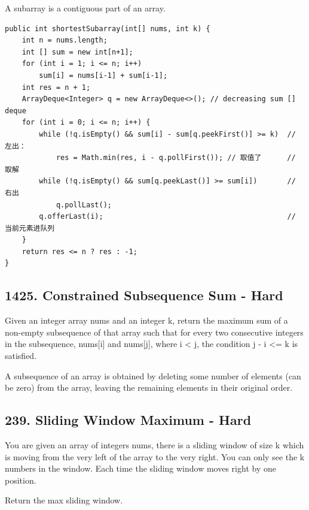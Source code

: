 \documentclass[9pt, b5paper]{article}
\begin{document}
A subarray is a contiguous part of an array.
\begin{verbatim}
public int shortestSubarray(int[] nums, int k) { 
    int n = nums.length;
    int [] sum = new int[n+1];  
    for (int i = 1; i <= n; i++)  
        sum[i] = nums[i-1] + sum[i-1];
    int res = n + 1;
    ArrayDeque<Integer> q = new ArrayDeque<>(); // decreasing sum [] deque
    for (int i = 0; i <= n; i++) {
        while (!q.isEmpty() && sum[i] - sum[q.peekFirst()] >= k)  // 左出：
            res = Math.min(res, i - q.pollFirst()); // 取值了      // 取解
        while (!q.isEmpty() && sum[q.peekLast()] >= sum[i])       // 右出
            q.pollLast();  
        q.offerLast(i);                                           // 当前元素进队列
    }
    return res <= n ? res : -1;
}
\end{verbatim}

\subsection{1425. Constrained Subsequence Sum - Hard}
\label{sec-5-2}
Given an integer array nums and an integer k, return the maximum sum of a non-empty subsequence of that array such that for every two consecutive integers in the subsequence, nums[i] and nums[j], where i < j, the condition j - i <= k is satisfied.

A subsequence of an array is obtained by deleting some number of elements (can be zero) from the array, leaving the remaining elements in their original order.

\subsection{239. Sliding Window Maximum - Hard}
\label{sec-5-3}
You are given an array of integers nums, there is a sliding window of size k which is moving from the very left of the array to the very right. You can only see the k numbers in the window. Each time the sliding window moves right by one position.

Return the max sliding window.
\end{document}
